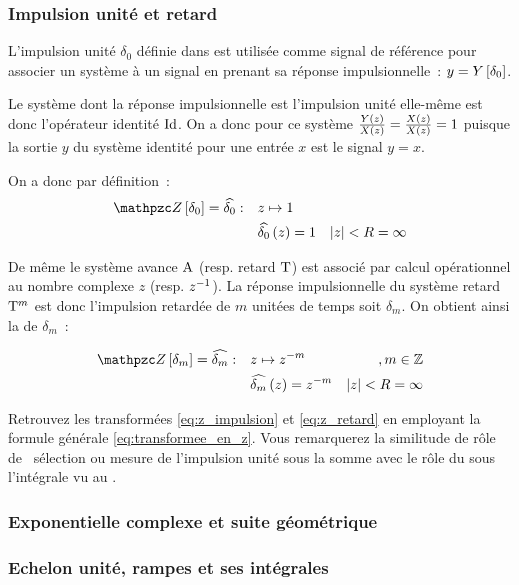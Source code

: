 \subsubsection{Impulsion unité et retard}

L'impulsion unité $\delta_0$ définie dans 
est utilisée comme signal de référence pour associer un système à un
signal en prenant sa réponse impulsionnelle~: $y=Y\left[\delta_0\right]$.

Le système dont la réponse impulsionnelle est l'impulsion unité
elle-même est donc l'opérateur identité $\mathrm{Id}$. On a donc pour ce
système $\frac{Y\left(z\right)}{X\left(z\right)}=\frac{X\left(z\right)}{X\left(z\right)}=1$ puisque la
sortie $y$ du système identité pour une entrée $x$ est le signal
$y=x$.

On a donc par définition~:
\begin{align}
  \label{eq:z_impulsion}
  \TZ\b{\delta_0}=\TZlui{\delta_0} : \quad &z \mapsto 1 \nonumber\\
  &\TZlui{\delta_0}\p{z} = 1 & \abs{z}<R = \infty
\end{align}

De même le système avance $\mathrm{A}$ (resp. retard $\mathrm{T}$) est
associé par calcul opérationnel au nombre complexe $z$
(resp. $z^{-1}$). La réponse impulsionnelle du système retard $\mathrm{T}^m$
est donc l'impulsion retardée de $m$ unitées de temps soit
$\delta_m$. On obtient ainsi la \teZ{} de $\delta_m$~:

\begin{align}
  \label{eq:z_retard}
  \TZ\b{\delta_m}=\TZlui{\delta_m}: \quad &z \mapsto z^{-m} &, m\in\Z \nonumber\\
  &\TZlui{\delta_m}\p{z} = z^{-m}  &  \abs{z}<R = \infty
\end{align}

\begin{exercice}
  Retrouvez les transformées \eqref{eq:z_impulsion} et \eqref{eq:z_retard} en employant la formule générale \eqref{eq:transformee_en_z}. Vous remarquerez la similitude de rôle de \og{} sélection ou mesure \fg{} de l'impulsion unité sous la somme avec le rôle du \Dirac{} sous l'intégrale vu au .
\end{exercice}
\subsubsection{Exponentielle complexe et suite géométrique}
\subsubsection{Echelon unité, rampes et ses intégrales}

